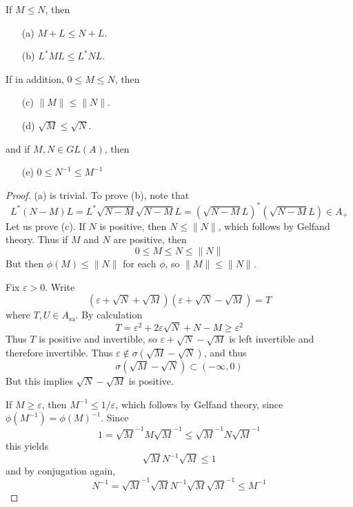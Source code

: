 \begin{prop}
    If $M \leq N$, then
    \begin{enumerate}
        \item[(a)] $M + L \leq N + L$.
        \item[(b)] $L^*ML \leq L^*NL$.
    \end{enumerate}
    If in addition, $0 \leq M \leq N$, then
    \begin{enumerate}
        \item[(c)] $\| M \| \leq \| N \|$.
        \item[(d)] $\sqrt{M} \leq \sqrt{N}$.
    \end{enumerate}
    and if $M, N \in GL(A)$, then
    \begin{enumerate}
        \item[(e)] $0 \leq N^{-1} \leq M^{-1}$
    \end{enumerate}
\end{prop}
\begin{proof}
    (a) is trivial. To prove (b), note that
    \[ L^*(N - M)L = L^*\sqrt{N - M}\sqrt{N - M}L = (\sqrt{N - M} L)^* (\sqrt{N - M} L) \in A_+ \]
    Let us prove (c). If $N$ is positive, then $N \leq \| N \|$, which follows by Gelfand theory. Thus if $M$ and $N$ are positive, then
    \[ 0 \leq M \leq N \leq \| N \| \]
    But then $\phi(M) \leq \| N \|$ for each $\phi$, so $\| M \| \leq \| N \|$.

    Fix $\varepsilon > 0$. Write
    \[ (\varepsilon + \sqrt{N} + \sqrt{M})(\varepsilon + \sqrt{N} - \sqrt{M}) = T \]
    where $T,U \in A_{\text{sa}}$. By calculation
    \[ T = \varepsilon^2 + 2 \varepsilon \sqrt{N} + N - M \geq \varepsilon^2 \]
    Thus $T$ is positive and invertible, so $\varepsilon + \sqrt{N} - \sqrt{M}$ is left invertible and therefore invertible. Thus $\varepsilon \not \in \sigma(\sqrt{M} - \sqrt{N})$, and thus
    \[ \sigma(\sqrt{M} - \sqrt{N}) \subset (-\infty, 0) \]
    But this implies $\sqrt{N} - \sqrt{M}$ is positive.

    If $M \geq \varepsilon$, then $M^{-1} \leq 1/\varepsilon$, which follows by Gelfand theory, since $\phi(M^{-1}) = \phi(M)^{-1}$. Since
    \[ 1 = \sqrt{M}^{-1}M\sqrt{M}^{-1} \leq \sqrt{M}^{-1} N \sqrt{M}^{-1} \]
    this yields
    \[ \sqrt{M} N^{-1} \sqrt{M} \leq 1 \]
    and by conjugation again,
    \[ N^{-1} = \sqrt{M}^{-1} \sqrt{M} N^{-1} \sqrt{M} \sqrt{M}^{-1} \leq M^{-1} \]
\end{proof}

